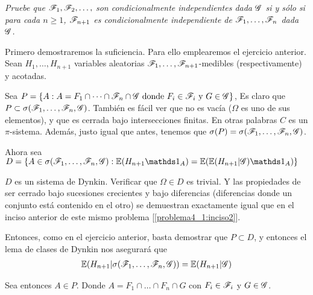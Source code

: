 \emph{
	Pruebe que $\mathscr{F}_1,\mathscr{F}_2,\ldots, $ son condicionalmente independientes dada 
	$\mathscr{G}$ si y s\'olo si para cada $n\geq 1$, $\mathscr{F}_{n+1}$ es condicionalmente 
	independiente de $\mathscr{F}_1,\ldots, \mathscr{F}_n$ dada $\mathscr{G}$. 
}

\afterstatement\pn

Primero demostraremos la suficiencia. Para ello emplearemos el ejercicio anterior.
Sean $H_1, \dots, H_{n+1}$ variables aleatorias $\mathscr{F}_1, \dots, \mathscr{F}_{n+1}$-medibles (respectivamente) 
y acotadas.\pn

Sea $P = \{ A : A = F_1 \cap \dots \cap \mathscr{F}_n \cap \mathscr{G} \text{ donde } F_i \in \mathscr{F}_i \text{ y } G \in \mathscr{G} \}$,
Es claro que $P \subset \sigma(\mathscr{F}_1, \dots, \mathscr{F}_n, \mathscr{G})$. También es fácil ver que no es vacía ($\Omega$ es uno de sus elementos), 
y que es cerrada bajo intersecciones finitas. En otras palabras $C$ es un $\pi$-sistema. Además, justo
igual que antes, tenemos que $\sigma(P) = \sigma(\mathscr{F}_1, \dots, \mathscr{F}_n, \mathscr{G})$.\pn

Ahora sea $D = \{ A \in \sigma(\F_1, \dots, \F_n, \G) : \E(H_{n+1} \indic_A) = \E(\E(H_{n+1} | \G) \indic_A) \}$

$D$ es un sistema de Dynkin. Verificar que $\Omega \in D$ es trivial. Y las propiedades de ser cerrado bajo sucesiones crecientes y 
bajo diferencias (diferencias donde un conjunto está contenido en el otro) se demuestran exactamente igual que en el inciso
anterior de este mismo problema [\ref{problema4_1:inciso2}].\pn

Entonces, como en el ejercicio anterior, basta demostrar que $P \subset D$, y entonces el lema de clases
de Dynkin nos asegurará que 
\begin{align}
 \mathbb{E}(H_{n+1} | \sigma(\mathscr{F}_1, \dots, \mathscr{F}_n, \mathscr{G})) = \mathbb{E}(H_{n+1} | \mathscr{G})   \label{problema4_1:hipotesis_suficiencia_4_1_3}
\end{align}\pn

Sea entonces $A \in P$. Donde $A = F_1 \cap \dots \cap F_n \cap G$ con $F_i \in \mathscr{F}_i$ y $G \in \mathscr{G}$.

